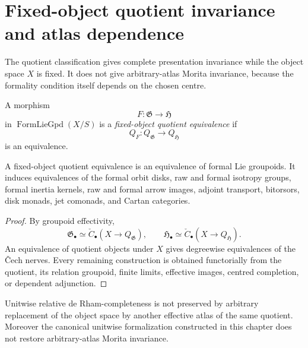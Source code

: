 \section{Fixed-object quotient invariance and atlas dependence}
\label{sec:flg-presentation-invariance}

The quotient classification gives complete presentation invariance while the
object space $X$ is fixed.  It does not give arbitrary-atlas Morita
invariance, because the formality condition itself depends on the chosen
centre.

\begin{definition}
\label{def:quotient-equivalence}
A morphism
\[
    F:\mathfrak G\to\mathfrak H
\]
in $\operatorname{FormLieGpd}(X/S)$ is a
\emph{fixed-object quotient equivalence} if
\[
    Q_F:
    Q_{\mathfrak G}\longrightarrow Q_{\mathfrak H}
\]
is an equivalence.
\end{definition}

\begin{proposition}
\label{prop:presentation-invariance}
A fixed-object quotient equivalence is an equivalence of formal Lie
groupoids.  It induces equivalences of the formal orbit disks, raw and formal
isotropy groups, formal inertia kernels, raw and formal arrow images, adjoint
transport, bitorsors, disk monads, jet comonads, and Cartan categories.
\end{proposition}

\begin{proof}
By groupoid effectivity,
\[
    \mathfrak G_\bullet
    \simeq
    \check C_\bullet(X\to Q_{\mathfrak G}),
    \qquad
    \mathfrak H_\bullet
    \simeq
    \check C_\bullet(X\to Q_{\mathfrak H}).
\]
An equivalence of quotient objects under $X$ gives degreewise equivalences of
the \v{C}ech nerves.  Every remaining construction is obtained functorially from
the quotient, its relation groupoid, finite limits, effective images, centred
completion, or dependent adjunction.
\end{proof}

\begin{proposition}
\label{prop:formality-not-morita-invariant}
Unitwise relative de Rham-completeness is not preserved by arbitrary
replacement of the object space by another effective atlas of the same
quotient.  Moreover the canonical unitwise formalization constructed in this
chapter does not restore arbitrary-atlas Morita invariance.
\end{proposition}

